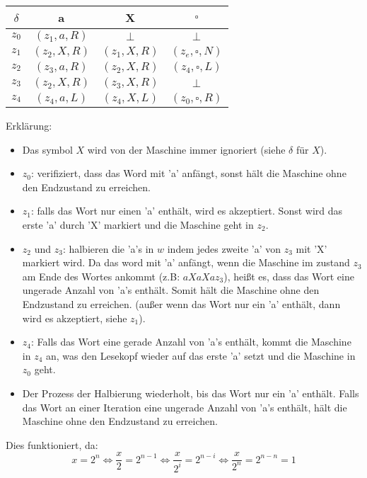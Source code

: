 \documentclass[a4paper,onecolumn,oneside,12pt,ngerman]{article}
\theoremstyle{plain} %
\theoremstyle{definition} %
\theoremstyle{remark} %
\theoremstyle{plain}
\begin{document}
\begin{center}
	\begin{tabular}{c|ccc}
	$\delta$ & a & X & $\square$ \\ \hline
	$z_0$ & $(z_1, a, R)$ & $\bot$ & $\bot$ \\
	$z_1$ & $(z_2, X, R)$ & $(z_1, X, R)$ & $(z_e, \square, N)$ \\
	$z_2$ & $(z_3, a, R)$ &$(z_2,X,R)$ & $(z_4, \square, L)$ \\
	$z_3$ & $(z_2, X, R)$ & $(z_3,X,R)$ & $\bot$ \\
	$z_4$ & $(z_4, a, L)$ & $(z_4, X, L)$ & $(z_0, \square, R)$ \\
	\end{tabular}
\end{center}

Erklärung:

\begin{itemize}
	\item Das symbol $X$ wird von der Maschine immer ignoriert (siehe $\delta$ für $X$).
	\item $z_0$: verifiziert, dass das Word mit 'a' anfängt, 
	sonst hält die Maschine ohne den Endzustand zu erreichen.
	\item $z_1$: falls das Wort nur einen 'a' enthält, wird es akzeptiert. 
	Sonst wird das erste 'a' durch 'X' markiert und die Maschine geht in $z_2$.
	\item $z_2$ und $z_3$: halbieren die 'a's in $w$ indem jedes zweite 'a' von $z_3$
	mit 'X' markiert wird. Da das word mit 'a' anfängt, wenn die Maschine im zustand $z_3$
	am Ende des Wortes ankommt (z.B: $aXaXaz_3$), heißt es, dass das Wort eine ungerade 
	Anzahl von 'a's enthält. Somit hält die Maschine ohne den Endzustand zu erreichen.
	(außer wenn das Wort nur ein 'a' enthält, dann wird es akzeptiert, siehe $z_1$).
	\item $z_4$: Falls das Wort eine gerade Anzahl von 'a's enthält, kommt die Maschine
	in $z_4$ an, was den Lesekopf wieder auf das erste 'a' setzt und die Maschine in $z_0$ geht.
	\item Der Prozess der Halbierung wiederholt, bis das Wort nur ein 'a' enthält.
	Falls das Wort an einer Iteration eine ungerade Anzahl von 'a's enthält, hält die Maschine ohne den Endzustand zu erreichen.
\end{itemize}
Dies funktioniert, da:
\[x = 2^n \Leftrightarrow \frac{x}{2} = 2^{n-1} \Leftrightarrow \frac{x}{2^i} = 2^{n-i} \Leftrightarrow \frac{x}{2^n} = 2^{n-n} = 1\]
\end{document}
